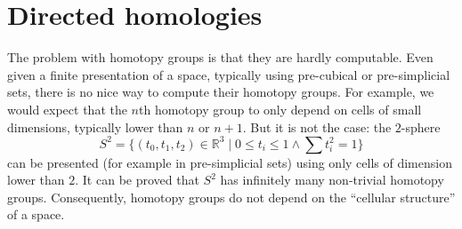 \chapter{Directed homologies}
\label{chap:dirhom}

The problem with homotopy groups is that they are hardly computable. Even given a finite presentation of a space, typically using pre-cubical or pre-simplicial sets, there is no nice way to compute their homotopy groups. For example, we would expect that the $n$th homotopy group to only depend on cells of small dimensions, typically lower than $n$ or $n+1$. But it is not the case: the $2$-sphere
$$S^2 =\{(t_0,t_1,t_2) \in \mathbb{R}^3 \mid 0 \leq t_i \leq 1 \wedge \sum t_i^2 = 1\}$$
can be presented (for example in pre-simplicial sets) using only cells of dimension lower than $2$. It can be proved that $S^2$ has infinitely many non-trivial homotopy groups. Consequently, homotopy groups do not depend on the ``cellular structure'' of a space.

